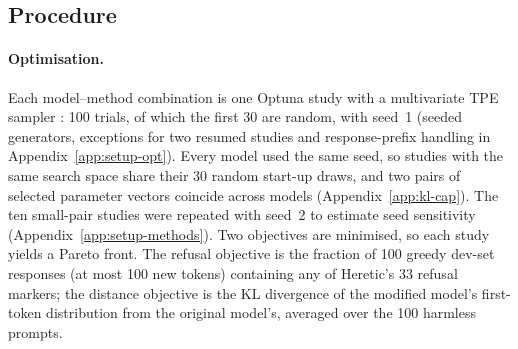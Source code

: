 \subsection{Procedure}
\label{sec:setup-opt}

\paragraph{Optimisation.} Each model--method combination is one Optuna study
\cite{akiba2019optuna} with a multivariate TPE sampler
\cite{bergstra2011algorithms}: 100 trials, of which the first 30 are random,
with seed~1 (seeded generators, exceptions for two resumed studies and
response-prefix handling in Appendix~\ref{app:setup-opt}). Every model used the
same seed, so studies with the same search space share their 30 random start-up
draws, and two pairs of selected parameter vectors coincide across models
(Appendix~\ref{app:kl-cap}).
The ten small-pair
studies were repeated with seed~2 to estimate seed sensitivity
(Appendix~\ref{app:setup-methods}). Two objectives are minimised, so each study
yields a Pareto front. The refusal objective is the fraction of 100 greedy
dev-set responses (at most 100 new tokens) containing any of Heretic's 33
refusal markers; the distance objective is the KL divergence of the modified
model's first-token distribution from the original model's, averaged over the
100 harmless prompts.

